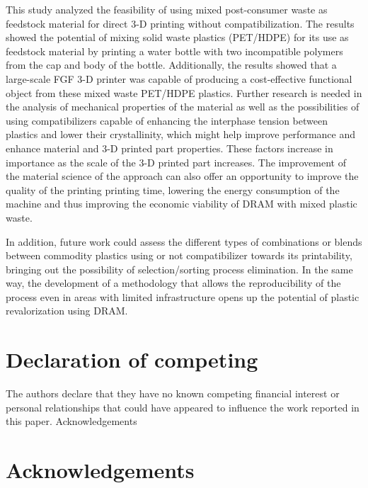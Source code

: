 \documentclass[
  12pt,
]{article}
\begin{document}
This study analyzed the feasibility of using mixed post-consumer waste
as feedstock material for direct 3-D printing without compatibilization.
The results showed the potential of mixing solid waste plastics
(PET/HDPE) for its use as feedstock material by printing a water bottle
with two incompatible polymers from the cap and body of the bottle.
Additionally, the results showed that a large-scale FGF 3-D printer was
capable of producing a cost-effective functional object from these mixed
waste PET/HDPE plastics. Further research is needed in the analysis of
mechanical properties of the material as well as the possibilities of
using compatibilizers capable of enhancing the interphase tension
between plastics and lower their crystallinity, which might help improve
performance and enhance material and 3-D printed part properties. These
factors increase in importance as the scale of the 3-D printed part
increases. The improvement of the material science of the approach can
also offer an opportunity to improve the quality of the printing
printing time, lowering the energy consumption of the machine and thus
improving the economic viability of DRAM with mixed plastic waste.

In addition, future work could assess the different types of
combinations or blends between commodity plastics using or not
compatibilizer towards its printability, bringing out the possibility of
selection/sorting process elimination. In the same way, the development
of a methodology that allows the reproducibility of the process even in
areas with limited infrastructure opens up the potential of plastic
revalorization using DRAM.

\hypertarget{declaration-of-competing}{%
\section*{Declaration of competing}\label{declaration-of-competing}}

The authors declare that they have no known competing financial interest
or personal relationships that could have appeared to influence the work
reported in this paper. Acknowledgements

\hypertarget{acknowledgements}{%
\section*{Acknowledgements}\label{acknowledgements}}
\end{document}
